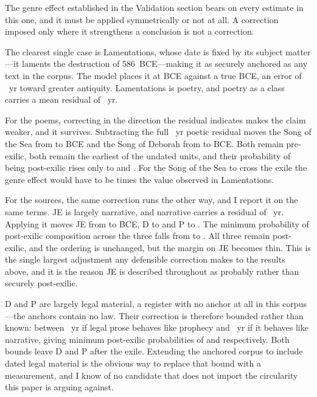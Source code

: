 \documentclass[10pt,letterpaper]{article}
\begin{document}
The genre effect established in the Validation section bears on every estimate
in this one, and it must be applied symmetrically or not at all.  A correction
imposed only where it strengthens a conclusion is not a correction.

The clearest single case is Lamentations, whose date is fixed by its subject
matter---it laments the destruction of 586~BCE---making it as securely anchored
as any text in the corpus.  The model places it at \lamPred{} BCE against a
true \lamTruth{} BCE, an error of \lamErr~yr toward greater antiquity.
Lamentations is poetry, and poetry as a class carries a mean residual of
\genPoetry~yr.

For the poems, correcting in the direction the residual indicates makes the
claim weaker, and it survives.  Subtracting the full \genPoetryAbs~yr poetic
residual moves the Song of the Sea from \poemSea{} to \genSeaAdj{} BCE and the
Song of Deborah from \poemDeb{} to \genDebAdj{} BCE.  Both remain pre-exilic,
both remain the earliest of the \NTargets{} undated units, and their
probability of being post-exilic rises only to \genSeaPadj{} and \genDebPadj.
For the Song of the Sea to cross the exile the genre effect would have to be
\genRatio{} times the value observed in Lamentations.

For the sources, the same correction runs the other way, and I report it on the
same terms.  JE is largely narrative, and narrative carries a residual of
\GNoffNar~yr.  Applying it moves JE from \srcJE{} to \GNadjJE{} BCE, D to
\GNadjD{} and P to \GNadjP.  The minimum probability of post-exilic composition
across the three falls from \GNminUncorr{} to \GNminNar.  All three remain
post-exilic, and the ordering is unchanged, but the margin on JE becomes thin.
This is the single largest adjustment any defensible correction makes to the
results above, and it is the reason JE is described throughout as probably
rather than securely post-exilic.

D and P are largely legal material, a register with no anchor at all in this
corpus---the \HBbooks{} anchors contain no law.  Their correction is therefore
bounded rather than known: between \GNoffPro~yr if legal prose behaves like
prophecy and \GNoffNar~yr if it behaves like narrative, giving minimum
post-exilic probabilities of \GNminPro{} and \GNminNar{} respectively.  Both
bounds leave D and P after the exile.  Extending the anchored corpus to include
dated legal material is the obvious way to replace that bound with a
measurement, and I know of no candidate that does not import the circularity
this paper is arguing against.
\end{document}
